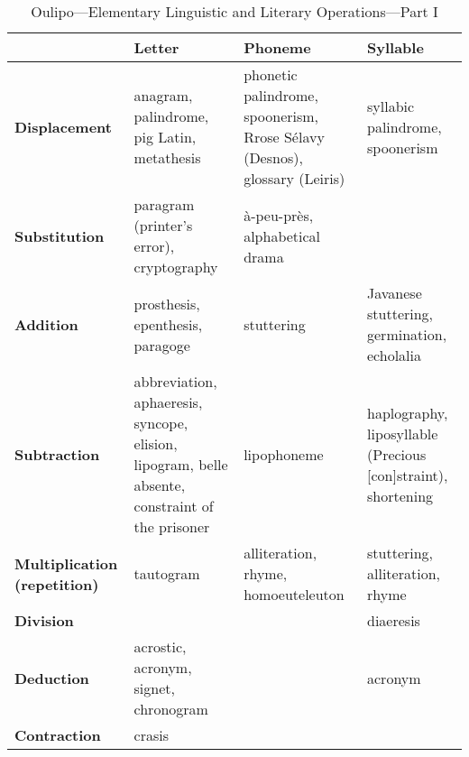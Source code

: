 \begin{table}[!htbp]
\caption[Oulipo Operations I]{Oulipo---Elementary Linguistic and Literary Operations---Part I}
\label{tab:oulipo1}
{\footnotesize
\begin{tabu}{X[l,0.7]X[l]X[l]X[l]}
  \toprule
  & \textbf{Letter}
  & \textbf{Phoneme}
  & \textbf{Syllable}
  \\ \midrule
  \textbf{Displacement} 
  & anagram, palindrome, pig Latin, metathesis 
  & phonetic palindrome, spoonerism, Rrose S{\'e}lavy (Desnos), glossary (Leiris)
  & syllabic palindrome, spoonerism
  \\
  \textbf{Substitution} 
  & paragram (printer's error), cryptography
  & {\`a}-peu-pr{\`e}s, alphabetical drama
  &
  \\
  \textbf{Addition} 
  & prosthesis, epenthesis, paragoge
  & stuttering
  & Javanese stuttering, germination, echolalia 
  \\
  \textbf{Subtraction} 
  & abbreviation, aphaeresis, syncope, elision, lipogram, belle absente, constraint of the prisoner
  & lipophoneme
  & haplography, liposyllable (Precious [con]straint), shortening
  \\
  \textbf{Multiplication (repetition)} 
  & tautogram
  & alliteration, rhyme, homoeuteleuton
  & stuttering, alliteration, rhyme
  \\
  \textbf{Division} 
  &
  &
  & diaeresis
  \\
  \textbf{Deduction} 
  & acrostic, acronym, signet, chronogram
  & 
  & acronym
  \\
  \textbf{Contraction}
  & crasis
  &
  & 
  \\
  \bottomrule
\end{tabu}
}
\end{table}

